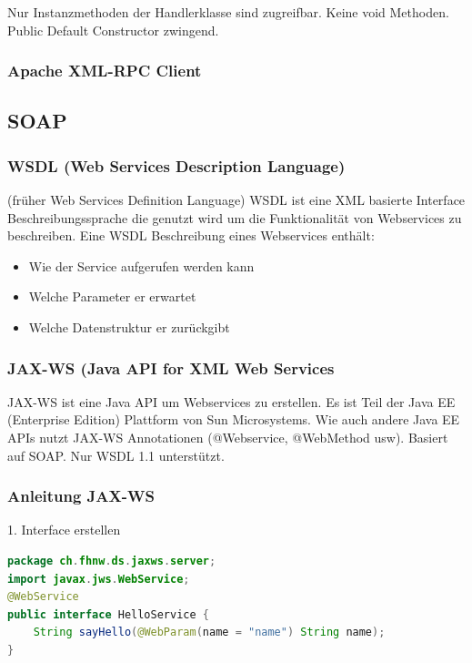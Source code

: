 \documentclass[10pt]{article}
\begin{document}
Nur Instanzmethoden der Handlerklasse sind zugreifbar. Keine void Methoden. Public Default Constructor zwingend.

\subsubsection{Apache XML-RPC Client}



\subsection{SOAP}
\subsubsection{WSDL (Web Services Description Language)}
(früher Web Services Definition Language)\linebreak
WSDL ist eine XML basierte Interface Beschreibungssprache die genutzt wird um die Funktionalität von Webservices zu beschreiben. Eine WSDL Beschreibung eines Webservices enthält:
\begin{itemize}
\item Wie der Service aufgerufen werden kann
\item Welche Parameter er erwartet
\item Welche Datenstruktur er zurückgibt
\end{itemize}

\subsubsection{JAX-WS (Java API for XML Web Services}
JAX-WS ist eine Java API um Webservices zu erstellen. Es ist Teil der Java EE (Enterprise Edition) Plattform von Sun Microsystems. Wie auch andere Java EE APIs nutzt JAX-WS Annotationen (@Webservice, @WebMethod usw). Basiert auf SOAP. Nur WSDL 1.1 unterstützt.

\subsubsection{Anleitung JAX-WS}
1. Interface erstellen
\begin{lstlisting}[language=Java, caption=Interface erstellen, style=JavaStyle]
package ch.fhnw.ds.jaxws.server;
import javax.jws.WebService;
@WebService
public interface HelloService {
	String sayHello(@WebParam(name = "name") String name);
}
\end{lstlisting}
\end{document}
